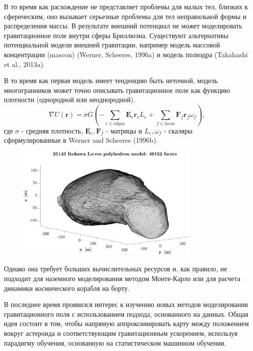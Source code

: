 В то время как расхождение не представляет проблемы для малых тел, близких к сферическим, оно вызывает серьезные проблемы для тел неправильной формы и распределения массы. В результате внешний потенциал не может моделировать гравитационное поле внутри сферы Бриллюэна. Существуют альтернативы потенциальной модели внешней гравитации, например модель массовой концентрации (mascon) (Werner, Scheeres, 1996a) и модель полиэдра (Takahashi et al., 2013a).

В то время как первая модель имеет тенденцию быть неточной, модель многогранников может точно описывать гравитационное поле как функцию плотности (однородной или неоднородной).
\[
    \nabla U(\mathbf{r}) = \sigma G
    \left(
        - \sum_{e \in \text{edges}}\mathbf{E}_e \mathbf{r}_e L_e
        + \sum_{f \in \text{faces}}\mathbf{F}_f \mathbf{r}_f \omega_f
    \right),
\]
где $\sigma$ - средняя плотность, $\mathbf{E}_e, \mathbf{F}_f$ - матрицы и $L_e, \omega_f$ - скаляры сформулированные в Werner and Scheeres (1996b).
\begin{figure}[h]
    \centering
    \includegraphics[width=0.8\textwidth]{chapters/tikhonov_s2/images/poly.jpg}
    \label{fg:1}
\end{figure}

Однако она требует больших вычислительных ресурсов и, как правило, не подходит для наземного моделирования методом Монте-Карло или для расчета динамики космического корабля на борту.

В последнее время проявился интерес к изучению новых методов моделирования гравитационного поля с использованием подхода, основанного на данных.
Общая идея состоит в том, чтобы напрямую аппроксимировать карту между положением вокруг астероида и соответствующим гравитационным ускорением, используя парадигму обучения, основанную на статистическом машинном обучении.


